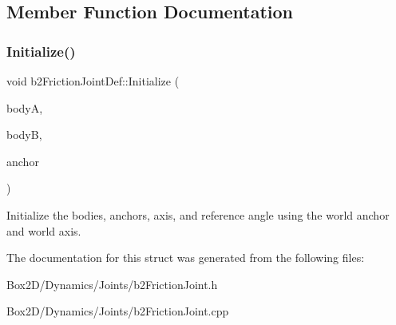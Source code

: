 \subsection{Member Function Documentation}
\mbox{\label{structb2_friction_joint_def_aee104f2aeb34dec4e17e3c52a98f7915}} 
\subsubsection{\texorpdfstring{Initialize()}{Initialize()}}
{\footnotesize\ttfamily void b2\+Friction\+Joint\+Def\+::\+Initialize (\begin{DoxyParamCaption}\item[{\hyperlink{classb2_body}{b2\+Body} $\ast$}]{bodyA,  }\item[{\hyperlink{classb2_body}{b2\+Body} $\ast$}]{bodyB,  }\item[{const \hyperlink{structb2_vec2}{b2\+Vec2} \&}]{anchor }\end{DoxyParamCaption})}

Initialize the bodies, anchors, axis, and reference angle using the world anchor and world axis. 

The documentation for this struct was generated from the following files\+:\begin{DoxyCompactItemize}
\item 
Box2\+D/\+Dynamics/\+Joints/b2\+Friction\+Joint.\+h\item 
Box2\+D/\+Dynamics/\+Joints/b2\+Friction\+Joint.\+cpp\end{DoxyCompactItemize}
